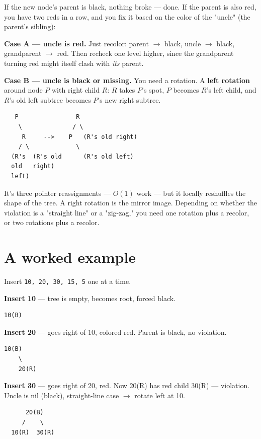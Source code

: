 \documentclass[11pt,a4paper]{article}
\begin{document}
If the new node's parent is black, nothing broke --- done. If the parent is also red, you have two reds in a row, and you fix it based on the color of the "uncle" (the parent's sibling):

\textbf{Case A --- uncle is red.} Just recolor: parent $\rightarrow$ black, uncle $\rightarrow$ black, grandparent $\rightarrow$ red. Then recheck one level higher, since the grandparent turning red might itself clash with \emph{its} parent.

\textbf{Case B --- uncle is black or missing.} You need a rotation. A \textbf{left rotation} around node $P$ with right child $R$: $R$ takes $P$'s spot, $P$ becomes $R$'s left child, and $R$'s old left subtree becomes $P$'s new right subtree.

\begin{lstlisting}
   P                R
    \              / \
     R     -->    P   (R's old right)
    / \             \
  (R's  (R's old      (R's old left)
  old   right)
  left)
\end{lstlisting}

It's three pointer reassignments --- $O(1)$ work --- but it locally reshuffles the shape of the tree. A right rotation is the mirror image. Depending on whether the violation is a "straight line" or a "zig-zag," you need one rotation plus a recolor, or two rotations plus a recolor.

\section{A worked example}

Insert \texttt{10, 20, 30, 15, 5} one at a time.

\textbf{Insert 10} --- tree is empty, becomes root, forced black.

\begin{lstlisting}
10(B)
\end{lstlisting}

\textbf{Insert 20} --- goes right of 10, colored red. Parent is black, no violation.

\begin{lstlisting}
10(B)
    \
    20(R)
\end{lstlisting}

\textbf{Insert 30} --- goes right of 20, red. Now 20(R) has red child 30(R) --- violation. Uncle is nil (black), straight-line case $\rightarrow$ rotate left at 10.

\begin{lstlisting}
      20(B)
     /    \
  10(R)  30(R)
\end{lstlisting}
\end{document}

